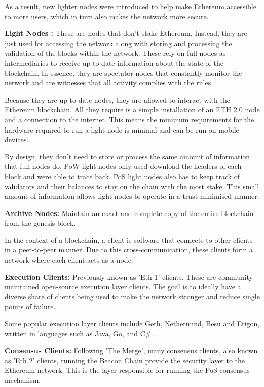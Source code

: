 As a result, new lighter nodes were introduced to help make Ethereum accessible to more users, which in turn also makes the network more secure.

\textbf{Light Nodes :}
These are nodes that don't stake Ethereum. Instead, they are just used for accessing the network along with storing and processing the validation of the blocks within the network. These rely on full nodes as intermediaries to receive up-to-date information about the state of the blockchain. In essence, they are spectator nodes that constantly monitor the network and are witnesses that all activity complies with the rules.

Because they are up-to-date nodes, they are allowed to interact with the Ethereum blockchain.  All they require is a simple installation of an ETH 2.0 node and a connection to the internet. This means the minimum requirements for the hardware required to run a light node is minimal and can be run on mobile devices.

By design, they don't need to store or process the same amount of information that full nodes do. PoW light nodes only used download the headers of each block and were able to trace back. PoS light nodes also has to keep track of validators and their balances to stay on the chain with the most stake. This small amount of information allows light nodes to operate in a trust-minimised manner.

\textbf{Archive Nodes:}
Maintain an exact and complete copy of the entire blockchain from the genesis block. 

In the context of a blockchain, a client is software that connects to other clients in a peer-to-peer manner. Due to this cross-communication, these clients form a network where each client acts as a node. 

\textbf{Execution Clients: }
Previously known as 'Eth 1' clients. These are community-maintained open-source execution layer clients. The goal is to ideally have a diverse share of clients being used to make the network stronger and reduce single points of failure.

Some popular execution layer clients include Geth, Nethermind, Besu and Erigon, written in languages such as Java, Go, and C\# \cite{EthereumEthereum.org}. 

\textbf{Consensus Clients: }
Following 'The Merge', many consensus clients, also known as 'Eth 2' clients, running the Beacon Chain provide the security layer to the Ethereum network. This is the layer responsible for running the PoS consensus mechanism.

